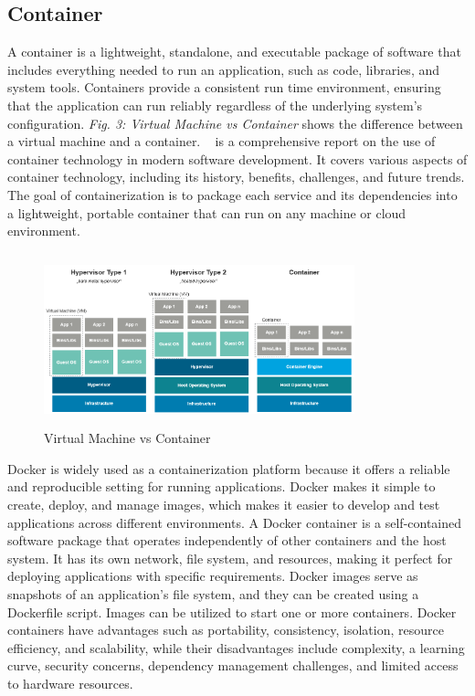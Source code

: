 \subsection{ Container}
A container is a lightweight, standalone, and executable package of software that includes everything needed to run an application, such as code, libraries, and system tools. Containers provide a consistent run time environment, ensuring that the application can run reliably regardless of the underlying system's configuration. \emph{Fig. 3: Virtual Machine vs Container} shows the difference between a virtual machine and a container.
~\cite{siddiq2014comprehen} is a comprehensive report on the use of container technology in modern software development. It covers various aspects of container technology, including its history, benefits, challenges, and future trends. The goal of containerization is to package each service and its dependencies into a lightweight, portable container that can run on any machine or cloud environment. 

\begin{figure}
\centering
\includegraphics[width=9cm, height=5cm]{vitualmachine-vs-dockercontainer}
\caption{Virtual Machine vs Container}
\end{figure}

Docker is widely used as a containerization platform because it offers a reliable and reproducible setting for running applications. Docker makes it simple to create, deploy, and manage images, which makes it easier to develop and test applications across different environments. A Docker container is a self-contained software package that operates independently of other containers and the host system. It has its own network, file system, and resources, making it perfect for deploying applications with specific requirements. Docker images serve as snapshots of an application's file system, and they can be created using a Dockerfile script. Images can be utilized to start one or more containers. Docker containers have advantages such as portability, consistency, isolation, resource efficiency, and scalability, while their disadvantages include complexity, a learning curve, security concerns, dependency management challenges, and limited access to hardware resources.

